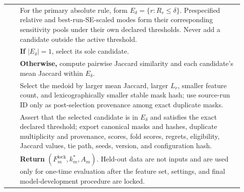 {\begin{longtable}{@{}>{\centering\arraybackslash}p{0.055\linewidth}>{\raggedright\arraybackslash}p{0.895\linewidth}@{}}
22 & For the primary absolute rule, form $E_\delta=\{r:R_r\leq\delta\}$. Prespecified relative and best-run-SE-scaled modes form their corresponding sensitivity pools under their own declared thresholds. Never add a candidate outside the active threshold. \\
23 & \textbf{If} $|E_\delta|=1$, select its sole candidate. \\
24 & \textbf{Otherwise,} compute pairwise Jaccard similarity and each candidate's mean Jaccard within $E_\delta$. \\
25 & Select the medoid by larger mean Jaccard, larger $L_r$, smaller feature count, and lexicographically smaller stable mask hash; use source-run ID only as post-selection provenance among exact duplicate masks. \\
26 & Assert that the selected candidate is in $E_\delta$ and satisfies the exact declared threshold; export canonical masks and hashes, duplicate multiplicity and provenance, scores, fold scores, regrets, eligibility, Jaccard values, tie path, seeds, version, and configuration hash. \\
27 & \textbf{Return} $(F_m^{\mathrm{lock}},k_m^*,A_m)$. Held-out data are not inputs and are used only for one-time evaluation after the feature set, settings, and final model-development procedure are locked. \\
\bottomrule
\end{longtable}
\addtocounter{table}{-1}
}
